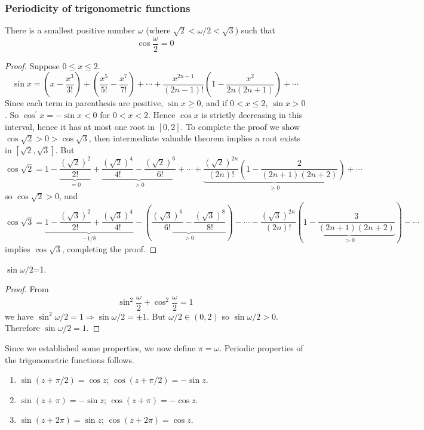 \documentclass[10pt, a4paper, twoside]{report}
\begin{document}
\subsubsection{Periodicity of trigonometric functions}
\begin{proposition}
    There is a smallest positive number \(\omega\) (where \(\sqrt{2}<\omega/2<\sqrt{3}\)) such that 
    \[\cos\frac{\omega}{2}=0\]
\end{proposition}
\begin{proof}
    Suppose \(0\leq x\leq 2\).
    \[\sin x=\left(x-\frac{x^3}{3!}\right)+\left(\frac{x^5}{5!}-\frac{x^7}{7!}\right)+\cdots+\frac{x^{2n-1}}{(2n-1)!}\left(1-\frac{x^2}{2n(2n+1)}\right)+\cdots\]
    Since each term in parenthesis are positive, \(\sin x\geq 0\), and if \(0<x\leq 2\), \(\sin x>0\). So \(\cos^\prime x=-\sin x<0\) for \(0<x<2\). Hence \(\cos x\) is strictly decreasing in this interval, hence it has at most one root in \([0,2]\). To complete the proof we show \(\cos\sqrt{2}>0>\cos\sqrt{3}\), then intermediate valuable theorem implies a root exists in \([\sqrt{2},\sqrt{3}]\). But 
    \[\cos\sqrt{2}=1-\underbrace{\frac{(\sqrt{2})^2}{2!}}_{=0}+\underbrace{\frac{(\sqrt{2})^4}{4!}-\frac{(\sqrt{2})^6}{6!}}_{>0}+\cdots+\underbrace{\frac{(\sqrt{2})^{2n}}{(2n)!}\left(1-\frac{2}{(2n+1)(2n+2)}\right)}_{>0}+\cdots\]
    so \(\cos\sqrt{2}>0\), and 
    \[\cos\sqrt{3}=\underbrace{1-\frac{(\sqrt{3})^2}{2!}+\frac{(\sqrt{3})^4}{4!}}_{-1/8}-\left(\underbrace{\frac{(\sqrt{3})^6}{6!}-\frac{(\sqrt{3})^8}{8!}}_{>0}\right)-\cdots-\frac{(\sqrt{3})^{2n}}{(2n)!}\left(\underbrace{1-\frac{3}{(2n+1)(2n+2)}}_{>0}\right)-\cdots\]
    implies \(\cos{\sqrt{3}}\), completing the proof.
\end{proof}
\begin{corollary}
    \(\sin\omega/2\)=1.
\end{corollary}
\begin{proof}
    From 
    \[\sin^2\frac\omega 2+\cos^2\frac\omega 2=1\]
    we have \(\sin^2\omega/2=1\Rightarrow\sin\omega/2=\pm 1\). But \(\omega/2\in(0,2)\) so \(\sin\omega/2>0\). Therefore \(\sin\omega/2=1\).
\end{proof}
Since we established some properties, we now define \(\pi=\omega\). Periodic properties of the \newline trigonometric functions follows.
\begin{theorem} \item[]
    \begin{enumerate}
        \item \(\sin(z+\pi/2)=\cos z\); \space \(\cos(z+\pi/2)=-\sin z\).
        \item \(\sin(z+\pi)=-\sin z\); \space \(\cos(z+\pi)=-\cos z\).
        \item \(\sin(z+2\pi)=\sin z\); \space \(\cos(z+2\pi)=\cos z\).
    \end{enumerate}
\end{theorem}
\end{document}
